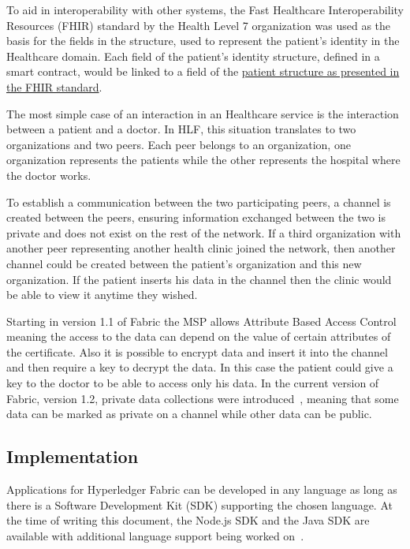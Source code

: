 To aid in interoperability with other systems, the Fast Healthcare
Interoperability Resources (FHIR) standard by the Health Level 7 organization
was used as the basis for the fields in the structure, used to represent the
patient's identity in the Healthcare domain.  Each field of the patient's
identity structure, defined in a smart contract, would be linked to a field of
the \href{http://www.hl7.org/fhir/patient.html}{patient structure as presented
in the FHIR standard}.

The most simple case of an interaction in an Healthcare service is the
interaction between a patient and a doctor. In HLF, this situation translates
to two organizations and two peers. Each peer belongs to an organization, one
organization represents the patients while the other represents the hospital
where the doctor works. 

To establish a communication between the two participating peers, a channel is
created between the peers, ensuring information exchanged between the two is
private and does not exist on the rest of the network.  If a third organization
with another peer representing another health clinic joined the network, then
another channel could be created between the patient's organization and this
new organization. If the patient inserts his data in the channel then the
clinic would be able to view it anytime they wished. 

Starting in version 1.1 of Fabric the MSP allows Attribute Based Access Control
meaning the access to the data can depend on the value of certain attributes of
the certificate. Also it is possible to encrypt data and insert it into the
channel and then require a key to decrypt the data. In this case the patient
could give a key to the doctor to be able to access only his data. In the
current version of Fabric, version 1.2, private data collections were
introduced~\cite{hyperledgerRoadmap2018}, meaning that some data can be marked
as private on a channel while other data can be public.

\subsection{Implementation}

Applications for Hyperledger Fabric can be developed in any language as long as
there is a Software Development Kit (SDK) supporting the chosen language. At
the time of writing this document, the Node.js SDK and the Java SDK are
available with additional language support being worked
on~\cite{hyperledgerRoadmap2018}.

